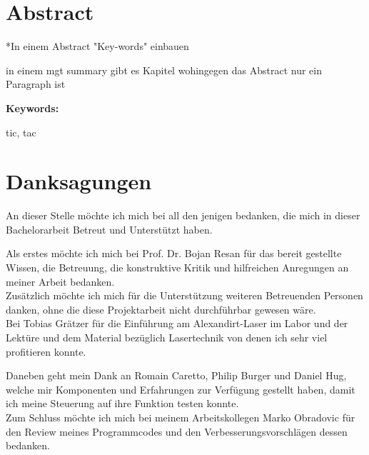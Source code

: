 \section*{Abstract}
*In einem Abstract "Key-words" einbauen

in einem mgt summary gibt es Kapitel wohingegen das Abstract nur ein Paragraph ist

\vspace{2ex}

\textbf{Keywords:}

tic, tac

\clearpage

\section*{Danksagungen}
An dieser Stelle möchte ich mich bei all den jenigen bedanken, die mich in dieser Bachelorarbeit Betreut und Unterstützt haben.

Als erstes möchte ich mich bei Prof. Dr. Bojan Resan für das bereit gestellte Wissen, die Betreuung, die konstruktive Kritik und hilfreichen Anregungen an meiner Arbeit bedanken.\\

Zusätzlich möchte ich mich für die Unterstützung weiteren Betreuenden Personen danken, ohne die diese Projektarbeit nicht durchführbar gewesen wäre.\\ Bei Tobias Grätzer für die Einführung am Alexandirt-Laser im Labor und der Lektüre und dem Material bezüglich Lasertechnik von denen ich sehr viel profitieren konnte.

Daneben geht mein Dank an Romain Caretto, Philip Burger und Daniel Hug, welche mir Komponenten und Erfahrungen zur Verfügung gestellt haben, damit ich meine Steuerung auf ihre Funktion testen konnte.\\

Zum Schluss möchte ich mich bei meinem Arbeitskollegen Marko Obradovic für den Review meines Programmcodes und den Verbesserungsvorschlägen dessen bedanken.
